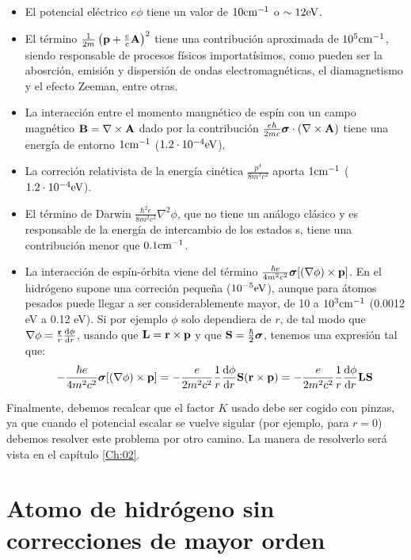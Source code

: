 \begin{itemize}
\item El potencial eléctrico $e\phi$ tiene un valor de $10\text{cm}^{-1}$ o $\sim 12 \text{eV}$.
\item El término $ \frac{1}{2m} \left( \mathbf{p}+\frac{e}{c}\mathbf{A} \right)^2$ tiene una contribución aproximada de $10^5 \text{cm}^{-1}$, siendo responsable de procesos físicos importatísimos, como pueden ser la abosrción, emisión y dispersión de ondas electromagnéticas, el diamagnetismo y el efecto Zeeman, entre otras.
\item La interacción entre el momento mangnético de espín con un campo magnético $\mathbf{B} = \nabla \times \mathbf{A}$ dado por la contribución $\frac{e\hbar}{2mc} \boldsymbol{\sigma} \cdot (\nabla \times \mathbf{A}) $ tiene una energía de entorno $1\text{cm}^{-1}$ ($1.2 \cdot 10^{-4} \text{eV}$). 
\item La correción relativista de la energía cinética $\frac{p^4}{8 m^3 c^2} $ aporta $1\text{cm}^{-1}$ ($1.2 \cdot 10^{-4} \text{eV}$).
\item El término de Darwin $\frac{\hbar^2 e}{8 m^2 c^2} \nabla^2 \phi$, que no tiene un análogo clásico y es responsable de la energía de intercambio de los estados s, tiene una contribución menor que $0.1\text{cm}^{-1}$.
\item La interacción de espín-órbita viene del término $\frac{ \hbar e}{4m^2 c^2} \boldsymbol{\sigma} [(\nabla \phi)\times \mathbf{p}]$. En el hidrógeno supone una correción pequeña ($10^{-5} \text{eV}$), aunque para átomos pesados puede llegar a ser considerablemente mayor, de 10 a $10^3 \text{cm}^{-1}$ (0.0012 eV a 0.12 eV). Si por ejemplo $\phi$ solo dependiera de $r$, de tal modo que $\nabla \phi = \frac{\mathbf{r}}{r} \frac{\mathrm{d} \phi}{\mathrm{d} r}$, usando que $\mathbf{L} = \mathbf{r} \times \mathbf{p}$ y que $\mathbf{S} = \frac{\hbar}{2} \boldsymbol{\sigma}$, tenemos una expresión tal que:
\begin{equation}
    -\frac{ \hbar e}{4m^2 c^2} \boldsymbol{\sigma} [(\nabla \phi)\times \mathbf{p}] = - \frac{e}{2m^2 c^2} \frac{1}{r} \frac{\mathrm{d} \phi}{\mathrm{d} r}  \mathbf{S} (\mathbf{r} \times \mathbf{p}) = - \frac{e}{2m^2 c^2} \frac{1}{r} \frac{\mathrm{d} \phi}{\mathrm{d} r} \mathbf{L} \mathbf{S}
\end{equation}
\end{itemize}
Finalmente, debemos recalcar que el factor $K$ usado debe ser cogido con pinzas, ya que cuando el potencial escalar se vuelve sigular (por ejemplo, para $r=0$) debemos resolver este problema por otro camino. La manera de resolverlo será vista en el capítulo \ref{Ch:02}.



\section{Atomo de hidrógeno sin correcciones de mayor orden}

